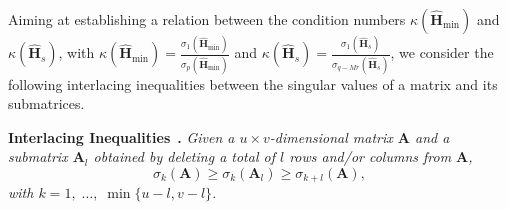 \documentclass{article}
\begin{document}
Aiming at establishing a relation between the condition numbers $\kappa(\hat{\mathbf{H}}_{\min})$ and $\kappa(\hat{\mathbf{H}}_s)$, with $\kappa(\hat{\mathbf{H}}_{\min}) = \frac{\sigma_1(\hat{\mathbf{H}}_{\min})}{\sigma_{p}(\hat{\mathbf{H}}_{\min})}$ and $\kappa(\hat{\mathbf{H}}_s) = \frac{\sigma_1(\hat{\mathbf{H}}_s)}{\sigma_{q-Mr}(\hat{\mathbf{H}}_s)}$, we consider the following interlacing inequalities between the singular values of a matrix and its submatrices.

\smallskip\noindent
\textbf{Interlacing Inequalities}~\cite{Horn_Mat_book}\textbf{.}\enspace
\textsl{Given a $u \times v$-dimensional matrix $\mathbf{A}$ and a submatrix $\mathbf{A}_l$ obtained by deleting a total of $l$ rows and/or columns from $\mathbf{A}$,
\begin{equation}
  \sigma_k(\mathbf{A}) \geq \sigma_{k}(\mathbf{A}_l) \geq \sigma_{k+l}(\mathbf{A}),
\end{equation}
with $k = 1, \; \ldots, \; \min\{u-l,v-l\}$.}
\end{document}
